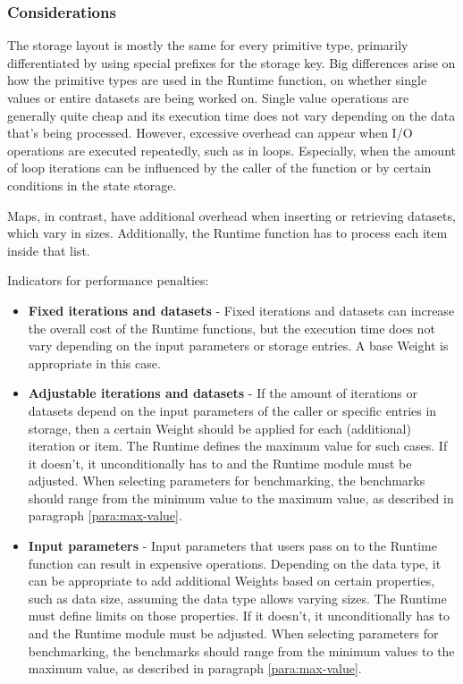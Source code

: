 \documentclass[11pt,a4paper]{article}
\begin{document}
\subsubsection{Considerations}\label{sect:primitive-types-considerations}

The storage layout is mostly the same for every primitive type, primarily
differentiated by using special prefixes for the storage key. Big differences
arise on how the primitive types are used in the Runtime function, on whether
single values or entire datasets are being worked on. Single value operations
are generally quite cheap and its execution time does not vary depending on the
data that's being processed. However, excessive overhead can appear when I/O
operations are executed repeatedly, such as in loops. Especially, when the amount
of loop iterations can be influenced by the caller of the function or by certain
conditions in the state storage.
\newline

Maps, in contrast, have additional overhead when inserting or retrieving
datasets, which vary in sizes. Additionally, the Runtime function has to process
each item inside that list.
\newline

Indicators for performance penalties:

\begin{itemize}
  \item \textbf{Fixed iterations and datasets} - Fixed iterations and datasets
  can increase the overall cost of the Runtime functions, but the execution time
  does not vary depending on the input parameters or storage entries. A base
  Weight is appropriate in this case.
  \item \textbf{Adjustable iterations and datasets} - If the amount of
  iterations or datasets depend on the input parameters of the caller or
  specific entries in storage, then a certain Weight should be applied for each
  (additional) iteration or item. The Runtime defines the maximum value for such
  cases. If it doesn't, it unconditionally has to and the Runtime module must be
  adjusted. \newline\newline
  When selecting parameters for benchmarking, the benchmarks should range from
  the minimum value to the maximum value, as described in paragraph
  \ref{para:max-value}.
  \item \textbf{Input parameters} - Input parameters that users pass on to the
  Runtime function can result in expensive operations. Depending on the data
  type, it can be appropriate to add additional Weights based on certain
  properties, such as data size, assuming the data type allows varying sizes.
  The Runtime must define limits on those properties. If it doesn't, it
  unconditionally has to and the Runtime module must be adjusted.
  \newline\newline
  When selecting parameters for benchmarking, the benchmarks should range from
  the minimum values to the maximum value, as described in paragraph
  \ref{para:max-value}.
\end{itemize}
\end{document}
